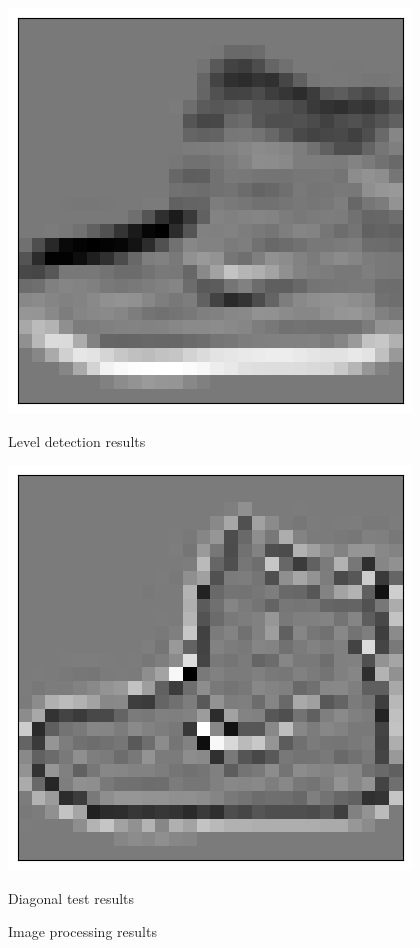 \documentclass[a4paper,12pt]{article}
\begin{document}
\begin{figure}[htbp]
    \vspace{1em}  %

    \begin{minipage}{0.45\textwidth}
        \centering
        \includegraphics[width=\linewidth]{images/lab2_1_hori.png}
        \caption*{Level detection results}
    \end{minipage}
    \hspace{0.05\textwidth}  %
    \begin{minipage}{0.45\textwidth}
        \centering
        \includegraphics[width=\linewidth]{images/lab2_1_diag.png}
        \caption*{Diagonal test results}
    \end{minipage}

    \caption{Image processing results}  %
\end{figure}
\end{document}
